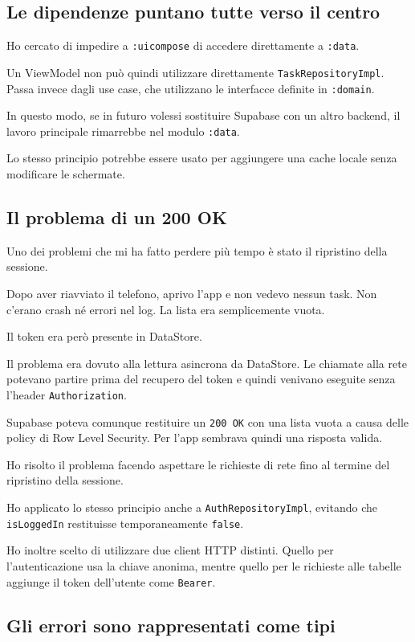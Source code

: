 \documentclass[11pt,a4paper]{article}
\begin{document}
\subsection{Le dipendenze puntano tutte verso il centro}

Ho cercato di impedire a \texttt{:uicompose} di accedere direttamente a
\texttt{:data}.

Un ViewModel non può quindi utilizzare direttamente
\texttt{TaskRepositoryImpl}. Passa invece dagli use case, che utilizzano le
interfacce definite in \texttt{:domain}.

In questo modo, se in futuro volessi sostituire Supabase con un altro backend,
il lavoro principale rimarrebbe nel modulo \texttt{:data}.

Lo stesso principio potrebbe essere usato per aggiungere una cache locale senza
modificare le schermate.


\subsection{Il problema di un 200 OK}

Uno dei problemi che mi ha fatto perdere più tempo è stato il ripristino della
sessione.

Dopo aver riavviato il telefono, aprivo l'app e non vedevo nessun task. Non
c'erano crash né errori nel log. La lista era semplicemente vuota.

Il token era però presente in DataStore.

Il problema era dovuto alla lettura asincrona da DataStore. Le chiamate alla rete
potevano partire prima del recupero del token e quindi venivano eseguite senza
l'header \texttt{Authorization}.

Supabase poteva comunque restituire un \texttt{200 OK} con una lista vuota a
causa delle policy di Row Level Security. Per l'app sembrava quindi una
risposta valida.

Ho risolto il problema facendo aspettare le richieste di rete fino al termine
del ripristino della sessione.

Ho applicato lo stesso principio anche a \texttt{AuthRepositoryImpl}, evitando
che \texttt{isLoggedIn} restituisse temporaneamente \texttt{false}.

Ho inoltre scelto di utilizzare due client HTTP distinti. Quello per
l'autenticazione usa la chiave anonima, mentre quello per le richieste alle
tabelle aggiunge il token dell'utente come \texttt{Bearer}.


\subsection{Gli errori sono rappresentati come tipi}
\end{document}
